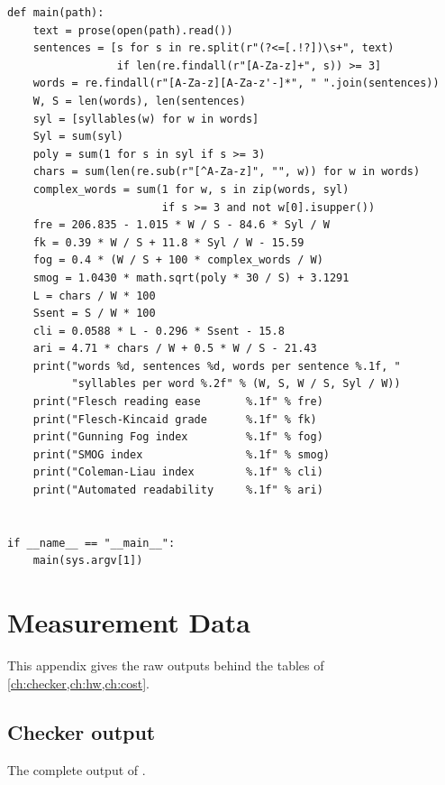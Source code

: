 \begin{lstlisting}[style=vspython]
def main(path):
    text = prose(open(path).read())
    sentences = [s for s in re.split(r"(?<=[.!?])\s+", text)
                 if len(re.findall(r"[A-Za-z]+", s)) >= 3]
    words = re.findall(r"[A-Za-z][A-Za-z'-]*", " ".join(sentences))
    W, S = len(words), len(sentences)
    syl = [syllables(w) for w in words]
    Syl = sum(syl)
    poly = sum(1 for s in syl if s >= 3)
    chars = sum(len(re.sub(r"[^A-Za-z]", "", w)) for w in words)
    complex_words = sum(1 for w, s in zip(words, syl)
                        if s >= 3 and not w[0].isupper())
    fre = 206.835 - 1.015 * W / S - 84.6 * Syl / W
    fk = 0.39 * W / S + 11.8 * Syl / W - 15.59
    fog = 0.4 * (W / S + 100 * complex_words / W)
    smog = 1.0430 * math.sqrt(poly * 30 / S) + 3.1291
    L = chars / W * 100
    Ssent = S / W * 100
    cli = 0.0588 * L - 0.296 * Ssent - 15.8
    ari = 4.71 * chars / W + 0.5 * W / S - 21.43
    print("words %d, sentences %d, words per sentence %.1f, "
          "syllables per word %.2f" % (W, S, W / S, Syl / W))
    print("Flesch reading ease       %.1f" % fre)
    print("Flesch-Kincaid grade      %.1f" % fk)
    print("Gunning Fog index         %.1f" % fog)
    print("SMOG index                %.1f" % smog)
    print("Coleman-Liau index        %.1f" % cli)
    print("Automated readability     %.1f" % ari)


if __name__ == "__main__":
    main(sys.argv[1])
\end{lstlisting}

\chapter{Measurement Data}
\label{app:data}

This appendix gives the raw outputs behind the tables of \cref{ch:checker,ch:hw,ch:cost}.

\section{Checker output}
The complete output of .

